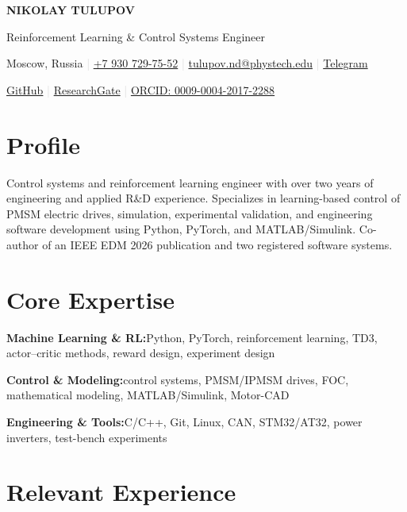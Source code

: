 \documentclass[10pt,a4paper]{article}
\newcommand{\skillrow}[2]{%
  \textbf{#1}\hspace{0.45em}#2\par
  \vspace{0.13em}
}
\begin{document}
\begin{center}
  {\fontsize{24}{27}\selectfont\sffamily\bfseries\color{accent}
   NIKOLAY TULUPOV}\par
  \vspace{0.22em}
  {\large\sffamily\color{textgray}
   Reinforcement Learning \& Control Systems Engineer}\par
  \vspace{0.48em}
  {\small
    Moscow, Russia
    \enspace\textcolor{lightgray}{|}\enspace
    \href{tel:+79307297552}{+7 930 729-75-52}
    \enspace\textcolor{lightgray}{|}\enspace
    \href{mailto:tulupov.nd@phystech.edu}{tulupov.nd@phystech.edu}
    \enspace\textcolor{lightgray}{|}\enspace
    \href{https://t.me/oncoming_lane}{Telegram}
  }\par
  \vspace{0.16em}
  {\small
    \href{https://github.com/oncominglane}{GitHub}
    \enspace\textcolor{lightgray}{|}\enspace
    \href{https://www.researchgate.net/profile/Nikolay-Tulupov}{ResearchGate}
    \enspace\textcolor{lightgray}{|}\enspace
    \href{https://orcid.org/0009-0004-2017-2288}{ORCID: 0009-0004-2017-2288}
  }
\end{center}

\section{Profile}

Control systems and reinforcement learning engineer with over two years of
engineering and applied R\&D experience. Specializes in learning-based control
of PMSM electric drives, simulation, experimental validation, and engineering
software development using Python, PyTorch, and MATLAB/Simulink. Co-author of
an IEEE EDM 2026 publication and two registered software systems.

\section{Core Expertise}

\skillrow{Machine Learning \& RL:}{Python, PyTorch, reinforcement learning, TD3,
actor--critic methods, reward design, experiment design}
\skillrow{Control \& Modeling:}{control systems, PMSM/IPMSM drives, FOC,
mathematical modeling, MATLAB/Simulink, Motor-CAD}
\skillrow{Engineering \& Tools:}{C/C++, Git, Linux, CAN, STM32/AT32, power
inverters, test-bench experiments}

\section{Relevant Experience}
\end{document}
